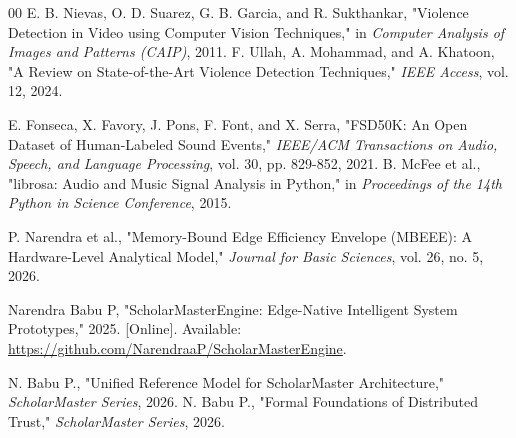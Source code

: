\documentclass[conference]{IEEEtran}
\begin{document}
\begin{thebibliography}{00}
 E. B. Nievas, O. D. Suarez, G. B. Garcia, and R. Sukthankar, "Violence Detection in Video using Computer Vision Techniques," in \textit{Computer Analysis of Images and Patterns (CAIP)}, 2011.
 F. Ullah, A. Mohammad, and A. Khatoon, "A Review on State-of-the-Art Violence Detection Techniques," \textit{IEEE Access}, vol. 12, 2024.

 E. Fonseca, X. Favory, J. Pons, F. Font, and X. Serra, "FSD50K: An Open Dataset of Human-Labeled Sound Events," \textit{IEEE/ACM Transactions on Audio, Speech, and Language Processing}, vol. 30, pp. 829-852, 2021.
 B. McFee et al., "librosa: Audio and Music Signal Analysis in Python," in \textit{Proceedings of the 14th Python in Science Conference}, 2015.

 P. Narendra et al., "Memory-Bound Edge Efficiency Envelope (MBEEE): A Hardware-Level Analytical Model," \textit{Journal for Basic Sciences}, vol. 26, no. 5, 2026.

Narendra Babu P, "ScholarMasterEngine: Edge-Native Intelligent System Prototypes," 2025. [Online]. Available: \url{https://github.com/NarendraaP/ScholarMasterEngine}.


 N. Babu P., "Unified Reference Model for ScholarMaster Architecture," \textit{ScholarMaster Series}, 2026.
 N. Babu P., "Formal Foundations of Distributed Trust," \textit{ScholarMaster Series}, 2026.
\end{thebibliography}
\end{document}
